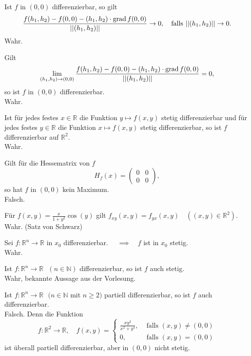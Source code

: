 Ist $f$ in $(0,0)$ differenzierbar, so gilt
\begin{displaymath}
  \frac{f(h_1, h_2) - f(0,0) - (h_1,h_2) \cdot \operatorname{grad} f(0,0)}{||(h_1, h_2)||} \to 0, \quad \text{falls } ||(h_1, h_2)|| \to 0.
\end{displaymath}
Wahr.

Gilt
\begin{displaymath}
  \lim_{(h_1, h_2) \to (0,0)} \frac{f(h_1, h_2) - f(0,0) - (h_1,h_2) \cdot \operatorname{grad} f(0,0)}{||(h_1, h_2)||} = 0,
\end{displaymath}
so ist $f$ in $(0,0)$ differenzierbar.\\
Wahr.

Ist für jedes festes $x\in \mathbb{R}$ die Funktion $y \mapsto f(x,y)$ stetig differenzierbar und für jedes festes $y \in \mathbb{R}$ die Funktion $x \mapsto f(x,y)$ stetig differenzierbar, so ist $f$ differenzierbar auf $\mathbb{R}^2$.\\
Wahr.

Gilt für die Hessematrix von $f$
\begin{displaymath}
  H_f(x) = \begin{pmatrix} 0 & 0 \\ 0 & 0\end{pmatrix},
\end{displaymath}
so hat $f$ in $(0,0)$ kein Maximum.\\
Falsch.

Für $f(x,y) = \frac{x}{1 +y^2} \cos(y)$ gilt $f_{xy}(x,y) = f_{yx}(x,y) \quad ((x,y) \in \mathbb{R}^2)$.\\
Wahr. (Satz von Schwarz)

Sei $f : \mathbb{R}^n \to \mathbb{R}$ in $x_0$ differenzierbar. $\quad \implies \quad f$ ist in $x_0$ stetig.\\
Wahr.

Ist $f : \mathbb{R}^n \to \mathbb{R} \text{ } (n \in \mathbb{N})$ differenzierbar, so ist $f$ auch stetig.\\
Wahr, bekannte Aussage aus der Vorlesung.

Ist $f : \mathbb{R}^n \to \mathbb{R} \text{ } (n \in \mathbb{N}$ mit $n \geq 2)$ partiell differenzierbar, so ist $f$ auch differenzierbar.\\
Falsch.
Denn die Funktion
\begin{displaymath}
  f : \mathbb{R}^2 \to \mathbb{R}, \quad f(x,y) =
  \begin{cases}
    \frac{xy^2}{x^2+y^4},& \text{ falls } (x,y) \neq (0,0)\\
    0,& \text{ falls } (x,y) = (0,0)
  \end{cases}
\end{displaymath}
ist überall partiell differenzierbar, aber in $(0,0)$ nicht stetig.


